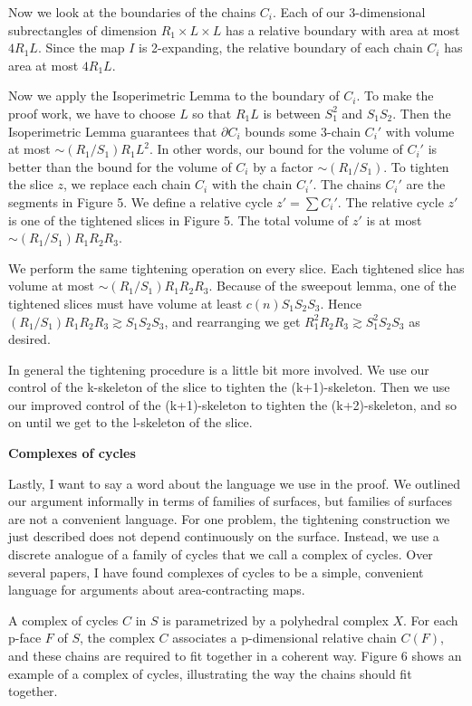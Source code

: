 \documentclass{amsart}
\newtheorem*{Theorem 1}{Theorem 1}
\newtheorem*{Theorem 2}{Theorem 2}
\newtheorem*{Estimate 1}{Estimate 1}
\newtheorem*{Estimate 2}{Estimate 2}
\newtheorem*{key lemma}{Key Lemma}
\numberwithin{equation}{section}
\begin{document}
Now we look at the boundaries of the chains $C_i$.  Each of our
3-dimensional subrectangles of dimension $R_1 \times L \times L$
has a relative boundary with area at most $4
R_1 L$.  Since the map $I$ is 2-expanding, the relative boundary
of each chain $C_i$ has area at most $4 R_1 L$.

Now we apply the Isoperimetric Lemma to the boundary of $C_i$. 
To make the proof work, we have to choose $L$ so that $R_1 L$ is
between $S_1^2$ and $S_1 S_2$.  Then the Isoperimetric Lemma
guarantees that $\partial C_i$ bounds some 3-chain $C_i'$ with
volume at most $\sim (R_1 / S_1) R_1 L^2$.  In other words, our
bound for the volume of $C_i'$ is better than the bound for the
volume of $C_i$ by a factor $\sim (R_1 / S_1)$.  To tighten the
slice $z$, we replace each chain $C_i$ with the chain $C_i'$. 
The chains $C_i'$ are the segments in Figure 5.  We define a
relative cycle $z' = \sum C_i'$.  The relative cycle $z'$ is one
of the tightened slices in Figure 5.  The 
total volume of $z'$ is at most
$\sim (R_1 / S_1) R_1 R_2 R_3$. 

We perform the same tightening operation on every slice.  Each
tightened slice has volume at most $\sim (R_1 / S_1) R_1 R_2
R_3$.  Because of the sweepout lemma, one of the tightened slices
must have volume at least $c(n) S_1 S_2 S_3$.  Hence $(R_1 /
S_1) R_1 R_2 R_3 \gtrsim S_1 S_2 S_3$, and rearranging we get
$R_1^2 R_2 R_3 \gtrsim S_1^2 S_2 S_3$ as desired.

In general the tightening procedure is a little bit more involved.  We use
our control of the k-skeleton of the slice to tighten the
(k+1)-skeleton.  Then we use our improved control of the
(k+1)-skeleton to tighten the (k+2)-skeleton, and so on until we
get to the l-skeleton of the slice.

\vskip5pt

{\bf Complexes of cycles}

\vskip5pt

Lastly, I want to say a word about the language we use in the
proof.  We outlined our argument informally in terms of families
of surfaces, but families of surfaces are not a convenient language. 
For one problem, the tightening construction we just described
does not depend continuously on the surface.  Instead, we use a
discrete analogue of a family of cycles that we call a complex of
cycles.  Over several papers, I have found complexes of cycles to
be a simple, convenient language for arguments about
area-contracting maps.

A complex of cycles $C$ in $S$ is parametrized by a polyhedral
complex $X$.  For each p-face $F$ of $S$, the complex $C$ associates
a p-dimensional relative chain $C(F)$, and these chains are
required to fit together in a coherent way.  Figure 6 shows an
example of a complex of cycles, illustrating the way the chains
should fit together.
\end{document}

